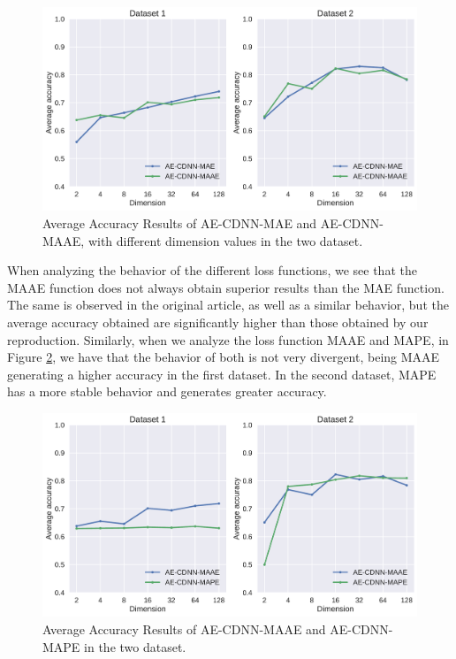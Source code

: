 \newpage


\begin{figure}[!ht]
\centering
\includegraphics[width=0.8\linewidth]{figure/average-MAE-MAAE.pdf}
  \caption{Average Accuracy Results of AE-CDNN-MAE and AE-CDNN-MAAE, with different dimension values in the two dataset.}
\label{fig:average}
\end{figure}

When analyzing the behavior of the different loss functions, we see that the MAAE function does not always obtain superior results than the MAE function. The same is observed in the original article, as well as a similar behavior, but the average accuracy obtained are significantly higher than those obtained by our reproduction. Similarly, when we analyze the loss function MAAE and MAPE, in Figure \ref{fig:average-maae-mape}, we have that the behavior of both is not very divergent, being MAAE generating a higher accuracy in the first dataset. In the second dataset, MAPE has a more stable behavior and generates greater accuracy. 


\begin{figure}[!ht]
\centering
\includegraphics[width=0.8\linewidth]{figure/average-MAAE-MAPE.pdf}
  \caption{Average Accuracy Results of AE-CDNN-MAAE and AE-CDNN-MAPE in the two dataset.}
\label{fig:average-maae-mape}
\end{figure}

